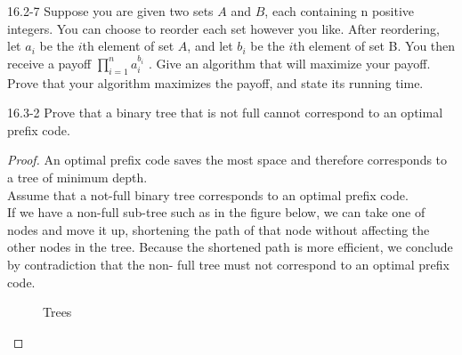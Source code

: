 \begin{problem}{16.2-7}
  Suppose you are given two sets $A$ and $B$, each containing n positive integers. You can choose to reorder each set
however you like. After reordering, let $a_i$ be the $i$th element of set $A$, and let $b_i$ be the $i$th element of set
B. You then receive a payoff $\displaystyle\prod\limits_{i = 1}^n a_i^{b_i}$ . Give an algorithm that will maximize your
   payoff. Prove that your algorithm maximizes the payoff, and state its running time.
\end{problem}

\begin{problem}{16.3-2}
  Prove that a binary tree that is not full cannot correspond to an optimal prefix code.
  \begin{solution}
    \begin{proof}
      An optimal prefix code saves the most space and therefore corresponds to a tree of minimum depth. \\ Assume that a
      not-full binary tree corresponds to an optimal prefix code. \\ If we have a non-full sub-tree such as in the
      figure below, we can take one of nodes and move it up, shortening the path of that node without affecting the
      other nodes in the tree. Because the shortened path is more efficient, we conclude by contradiction that the non-
      full tree must not correspond to an optimal prefix code. \qedhere
      \begin{figure}[H]
        \centering
        \caption{Trees}

\end{figure}
\end{proof}
\end{solution}
\end{problem}
